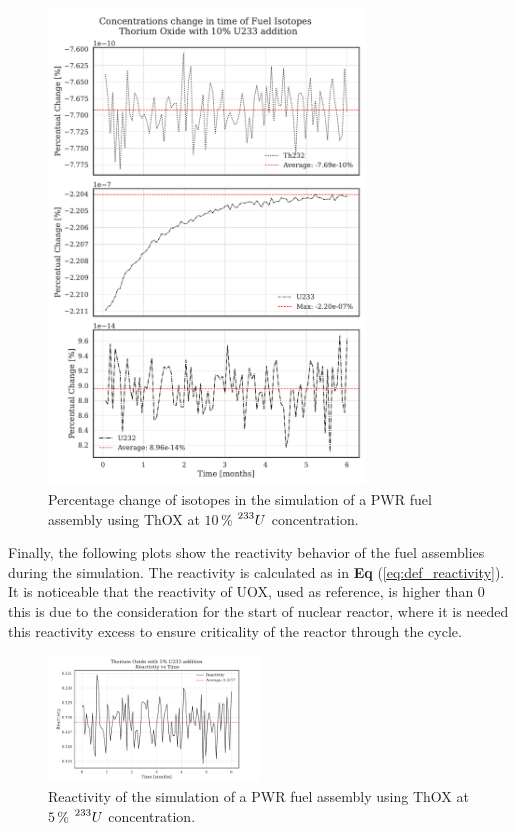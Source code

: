 \begin{figure}[h]
    \centering
    \includegraphics[width=0.75\textwidth, height=0.75\textheight]{Kap7/Figures_Kap7/percentual_change_th232_U233_10.pdf}
    \caption{Percentage change of isotopes in the simulation of a PWR fuel assembly using ThOX at \(10 \, \%\) \(\prescript{233}{}{U}\) concentration.}
    \label{fig:th_u233_10}
\end{figure}


Finally, the following plots show the reactivity behavior of the fuel assemblies during the simulation. The reactivity is calculated as in \textbf{Eq} (\ref{eq:def_reactivity}). It is noticeable that the reactivity of UOX, used as reference, is higher than \(0\) this is due to the consideration for the start of nuclear reactor, where it is needed this reactivity excess to ensure criticality of the reactor through the cycle.

\begin{figure}
    \centering
    \includegraphics[width=0.5\textwidth, scale=0.5]{Kap7/Figures_Kap7/Reactivity_vs_Time_ThOX_U233_5.pdf}
    \caption{Reactivity of the simulation of a PWR fuel assembly using ThOX at \(5 \, \%\) \(\prescript{233}{}{U}\) concentration.}
    \label{fig:reactivity_th_u233_5}
\end{figure}

